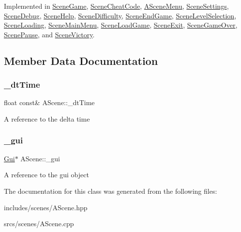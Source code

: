 Implemented in \hyperlink{class_scene_game_a5e23048e3ad8c6fde2d753ed7449e2d5}{Scene\+Game}, \hyperlink{class_scene_cheat_code_ab6ae0c8b3adbce736429e61a27966e31}{Scene\+Cheat\+Code}, \hyperlink{class_a_scene_menu_a1deeb5fd9be97376998cd2af36f29744}{A\+Scene\+Menu}, \hyperlink{class_scene_settings_ac32c443d620d0417b301193e87885a91}{Scene\+Settings}, \hyperlink{class_scene_debug_a97234cec6e43aa3d891e3f6d2ff51528}{Scene\+Debug}, \hyperlink{class_scene_help_aa5170e0722a6aecbfeea1f920d09cff7}{Scene\+Help}, \hyperlink{class_scene_difficulty_a2a3d3328b04df7047cc03725a9c5eb3c}{Scene\+Difficulty}, \hyperlink{class_scene_end_game_a36b55558e75b9cad9d17a28d8a1ce8d2}{Scene\+End\+Game}, \hyperlink{class_scene_level_selection_a9784885da4583eaba695812bedf8847c}{Scene\+Level\+Selection}, \hyperlink{class_scene_loading_a5b4f2b636e55908bb2f29180aa875201}{Scene\+Loading}, \hyperlink{class_scene_main_menu_a5d095883d0b1fceb3125ef2689a7a09c}{Scene\+Main\+Menu}, \hyperlink{class_scene_load_game_ad33de3b5d98596754f058a4e096ba1b3}{Scene\+Load\+Game}, \hyperlink{class_scene_exit_a60fd49ea48551bd3035efa7cabe4d08d}{Scene\+Exit}, \hyperlink{class_scene_game_over_ac4547b0ed87f3c324e75dafb8f96b5af}{Scene\+Game\+Over}, \hyperlink{class_scene_pause_a376de6952be83718fb19d268d9327ef6}{Scene\+Pause}, and \hyperlink{class_scene_victory_aea51a7b48a3243175e1759b20f853c16}{Scene\+Victory}.



\subsection{Member Data Documentation}
\mbox{\label{class_a_scene_a8cbb61bc0c24add293a08d3cc83ac2ea}} 
\subsubsection{\texorpdfstring{\+\_\+dt\+Time}{\_dtTime}}
{\footnotesize\ttfamily float const\& A\+Scene\+::\+\_\+dt\+Time\hspace{0.3cm}{\ttfamily [protected]}}

A reference to the delta time \mbox{\label{class_a_scene_afdf549ea35306aecfa7a7976a5594fe1}} 
\subsubsection{\texorpdfstring{\+\_\+gui}{\_gui}}
{\footnotesize\ttfamily \hyperlink{class_gui}{Gui}$\ast$ A\+Scene\+::\+\_\+gui\hspace{0.3cm}{\ttfamily [protected]}}

A reference to the gui object 

The documentation for this class was generated from the following files\+:\begin{DoxyCompactItemize}
\item 
includes/scenes/A\+Scene.\+hpp\item 
srcs/scenes/A\+Scene.\+cpp\end{DoxyCompactItemize}
